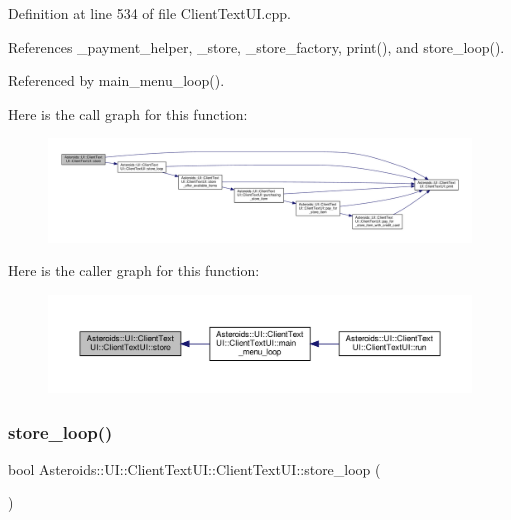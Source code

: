 Definition at line 534 of file Client\+Text\+U\+I.\+cpp.



References \+\_\+payment\+\_\+helper, \+\_\+store, \+\_\+store\+\_\+factory, print(), and store\+\_\+loop().



Referenced by main\+\_\+menu\+\_\+loop().

Here is the call graph for this function\+:
\nopagebreak
\begin{figure}[H]
\begin{center}
\leavevmode
\includegraphics[width=350pt]{classAsteroids_1_1UI_1_1ClientTextUI_1_1ClientTextUI_ae228a731be242ef0cf88005c2c03acee_cgraph}
\end{center}
\end{figure}
Here is the caller graph for this function\+:
\nopagebreak
\begin{figure}[H]
\begin{center}
\leavevmode
\includegraphics[width=350pt]{classAsteroids_1_1UI_1_1ClientTextUI_1_1ClientTextUI_ae228a731be242ef0cf88005c2c03acee_icgraph}
\end{center}
\end{figure}
\mbox{\label{classAsteroids_1_1UI_1_1ClientTextUI_1_1ClientTextUI_a66aab545b0cd59af6bec829a1b82be89}} 
\subsubsection{\texorpdfstring{store\+\_\+loop()}{store\_loop()}}
{\footnotesize\ttfamily bool Asteroids\+::\+U\+I\+::\+Client\+Text\+U\+I\+::\+Client\+Text\+U\+I\+::store\+\_\+loop (\begin{DoxyParamCaption}{ }\end{DoxyParamCaption})\hspace{0.3cm}{\ttfamily [private]}}



